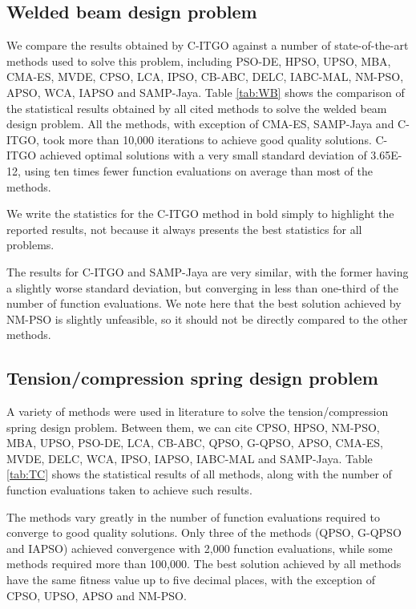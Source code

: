 \subsection{Welded beam design problem}





We compare the results obtained by C-ITGO against a number of state-of-the-art methods used to solve this problem, including PSO-DE, HPSO, UPSO, MBA, CMA-ES, MVDE, CPSO, LCA, IPSO, CB-ABC, DELC, IABC-MAL, NM-PSO, APSO, WCA, IAPSO and SAMP-Jaya. Table \ref{tab:WB} shows the comparison of the statistical results obtained by all cited methods to solve the welded beam design problem. All the methods, with exception of CMA-ES, SAMP-Jaya and C-ITGO, took more than 10,000 iterations to achieve good quality solutions. C-ITGO achieved optimal solutions with a very small standard deviation of 3.65E-12, using ten times fewer function evaluations on average than most of the methods.

We write the statistics for the C-ITGO method in bold simply to highlight the reported results, not because it always presents the best statistics for all problems.



The results for C-ITGO and SAMP-Jaya are very similar, with the former having a slightly worse standard deviation, but converging in less than one-third of the number of function evaluations. We note here that the best solution achieved by NM-PSO is slightly unfeasible, so it should not be directly compared to the other methods.




\subsection{Tension/compression spring design problem}





A variety of methods were used in literature to solve the tension/compression spring design problem. Between them, we can cite CPSO, HPSO, NM-PSO, MBA, UPSO, PSO-DE, LCA, CB-ABC, QPSO, G-QPSO, APSO, CMA-ES, MVDE, DELC, WCA, IPSO, IAPSO, IABC-MAL and SAMP-Jaya. Table \ref{tab:TC} shows the statistical results of all methods, along with the number of function evaluations taken to achieve such results.




The methods vary greatly in the number of function evaluations required to converge to good quality solutions. Only three of the methods (QPSO, G-QPSO and IAPSO) achieved convergence with 2,000 function evaluations, while some methods required more than 100,000. The best solution achieved by all methods have the same fitness value up to five decimal places, with the exception of CPSO, UPSO, APSO and NM-PSO.
 
